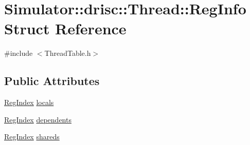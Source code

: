 \hypertarget{struct_simulator_1_1drisc_1_1_thread_1_1_reg_info}{\section{Simulator\+:\+:drisc\+:\+:Thread\+:\+:Reg\+Info Struct Reference}
\label{struct_simulator_1_1drisc_1_1_thread_1_1_reg_info}
}


{\ttfamily \#include $<$Thread\+Table.\+h$>$}

\subsection*{Public Attributes}
\begin{DoxyCompactItemize}
\item 
\hyperlink{namespace_simulator_ab00c9033de4c9a17db7b53d6c292515c}{Reg\+Index} \hyperlink{struct_simulator_1_1drisc_1_1_thread_1_1_reg_info_a604f9c620d2d35ec92ed1c5ea2030a56}{locals}
\item 
\hyperlink{namespace_simulator_ab00c9033de4c9a17db7b53d6c292515c}{Reg\+Index} \hyperlink{struct_simulator_1_1drisc_1_1_thread_1_1_reg_info_a79a19b90bdf8773d7a0d9b37f95d980a}{dependents}
\item 
\hyperlink{namespace_simulator_ab00c9033de4c9a17db7b53d6c292515c}{Reg\+Index} \hyperlink{struct_simulator_1_1drisc_1_1_thread_1_1_reg_info_a60537a9dc0ff0247a4bcf54b140a10be}{shareds}
\end{DoxyCompactItemize}


